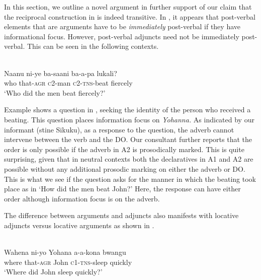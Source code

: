 \documentclass[output=paper]{langsci/langscibook}
\begin{document}
In this section, we outline a novel argument in further support of our claim that the reciprocal construction in  is indeed transitive. In , it appears that post-verbal elements that are arguments have to be \textit{immediately} post-verbal if they have informational focus. However, post-verbal adjuncts need not be immediately post-verbal. This can be seen in the following contexts.



\ea\label{ex:safir:14}
\settowidth{}
  \\
\gll Naanu  ni-ye    ba-saani   ba-a-pa   lukali? \\
who  that-\textsc{agr}   \textsc{c}2-man   \textsc{c}2-\textsc{tns}-beat   fiercely\\
\glt ‘Who did the men beat fiercely?’ \\
\z
\z


Example  shows a question in , seeking the identity of the person who received a beating. This question places information focus on \textit{Yohanna.} As indicated by our informant (stine Sikuku), as a response to the question, the adverb cannot intervene between the verb and the DO. Our consultant further reports that the order is only possible if the adverb in A2 is prosodically marked. This is quite surprising, given that in neutral contexts both the declaratives in A1 and A2 are possible without any additional prosodic marking on either the adverb or DO. This is what we see if the question asks for the manner in which the beating took place as in ‘How did the men beat John?’ Here, the response can have either order although information focus is on the adverb. 

The difference between arguments and adjuncts also manifests with locative adjuncts versus locative arguments as shown in .  


\ea\label{ex:safir:15}
\settowidth{}
  \\
\gll Wahena  ni-yo    Yohana  a-a-kona  bwangu \\
where     that-\textsc{agr}   John     \textsc{c1-tns}-sleep  quickly \\
\glt ‘Where did John sleep quickly?’ \\
\z
\z
{}
\end{document}
